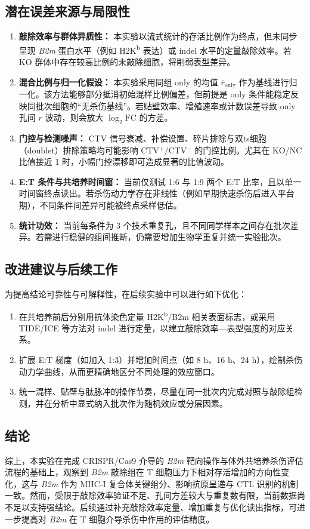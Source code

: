 \subsection{潜在误差来源与局限性}
\begin{enumerate}
  \item \textbf{敲除效率与群体异质性：} 本实验以流式统计的存活比例作为终点，但未同步呈现 \textit{B2m} 蛋白水平（例如 H2K\textsuperscript{b} 表达）或 indel 水平的定量敲除效率。若 KO 群体中存在较高比例的未敲除细胞，将削弱表型差异。
  \item \textbf{混合比例与归一化假设：} 本实验采用同组 only 的均值 $\overline r_{\mathrm{only}}$ 作为基线进行归一化。该方法能够部分抵消初始混样比例偏差，但前提是 only 条件能稳定反映同批次细胞的``无杀伤基线''。若贴壁效率、增殖速率或计数误差导致 only 孔间 $r$ 波动，则会放大 $\log_2\mathrm{FC}$ 的方差。
  \item \textbf{门控与检测噪声：} CTV 信号衰减、补偿设置、碎片排除与双ts细胞（doublet）排除策略均可能影响 CTV$^+$/CTV$^-$ 的门控比例。尤其在 KO/NC 比值接近 1 时，小幅门控漂移即可造成显著的比值波动。
  \item \textbf{E:T 条件与共培养时间窗：} 当前仅测试 1:6 与 1:9 两个 E:T 比率，且以单一时间窗终点读出。若杀伤动力学存在非线性（例如早期快速杀伤后进入平台期），不同条件间差异可能被终点采样低估。
  \item \textbf{统计功效：} 当前每条件为 3 个技术重复孔，且不同同学样本之间存在批次差异。若需进行稳健的组间推断，仍需要增加生物学重复并统一实验批次。
\end{enumerate}

\subsection{改进建议与后续工作}
为提高结论可靠性与可解释性，在后续实验中可以进行如下优化：
\begin{enumerate}
  \item 在共培养前后分别用抗体染色定量 H2K\textsuperscript{b}/B2m 相关表面标志，或采用 TIDE/ICE 等方法对 indel 进行定量，以建立敲除效率—表型强度的对应关系。
  \item 扩展 E:T 梯度（如加入 1:3）并增加时间点（如 8 h、16 h、24 h），绘制杀伤动力学曲线，从而更精确地区分不同处理的效应窗口。
  \item 统一混样、贴壁与肽脉冲的操作节奏，尽量在同一批次内完成对照与敲除组检测，并在分析中显式纳入批次作为随机效应或分层因素。
\end{enumerate}

\subsection{结论}
综上，本实验在完成 CRISPR/Cas9 介导的 \textit{B2m} 靶向操作与体外共培养杀伤评估流程的基础上，观察到 \textit{B2m} 敲除组在 T 细胞压力下相对存活增加的方向性变化，这与 \textit{B2m} 作为 MHC-I 复合体关键组分、影响抗原呈递与 CTL 识别的机制一致。然而，受限于敲除效率验证不足、孔间方差较大与重复数有限，当前数据尚不足以支持强结论。后续通过补充敲除效率定量、增加重复与优化读出指标，可进一步提高对 \textit{B2m} 在 T 细胞介导杀伤中作用的评估精度。